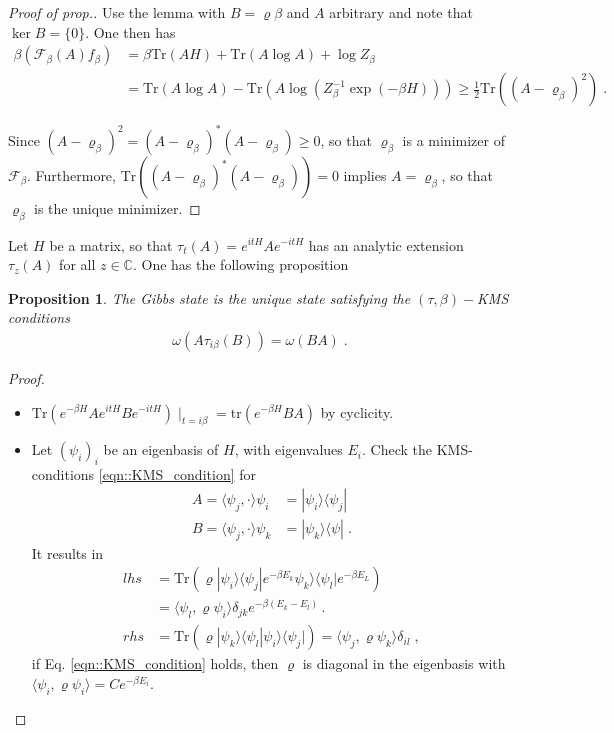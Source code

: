 \documentclass[
a4paper, %
11pt, %
onecolumn, %
openany, %
]{memoir}
\theoremstyle{definition}
\theoremstyle{remark}
\theoremstyle{plain}
\newtheorem{prop}[definition]{Proposition}
\begin{document}
\begin{proof}[Proof of prop.]
	Use the lemma with $B=\varrho\beta$ and $A$ arbitrary and note that $\ker B=\{0\}$. One then has \begin{align}
	\beta(\mathcal{F}_{\beta}(A)f_{\beta})&=\beta \mathrm{Tr}(AH)+\mathrm{Tr}(A\log A)+\log Z_{\beta}\\
	&=\mathrm{Tr}(A\log A)-\mathrm{Tr}(A\log (Z_{\beta}^{-1}\exp(-\beta H)))\geq \frac{1}{2} \mathrm{Tr}((A-\varrho_{\beta})^2)\; .
	\end{align}

Since $(A-\varrho_{\beta})^2=(A-\varrho_{\beta})^*(A-\varrho_{\beta})\geq 0$, so that $\varrho_{\beta}$ is a minimizer of $\mathcal{F}_{\beta}$. Furthermore, $\mathrm{Tr}((A-\varrho_{\beta})^*(A-\varrho_{\beta}))=0$ implies $A=\varrho_{\beta}$, so that $\varrho_{\beta}$ is the unique minimizer.\end{proof}
Let $H$ be a matrix, so that $\tau_t(A)=e^{itH}Ae^{-itH}$ has an analytic extension $\tau_z(A)$ for all $z\in\mathbb{C}$. One has the following proposition \begin{prop}
	The Gibbs state is the unique state satisfying the $(\tau,\beta)-$KMS conditions \begin{align}
	\omega(A\tau_{i\beta}(B))=\omega(BA) \label{eqn::KMS_condition}\; .
	\end{align}
\end{prop}
\begin{proof}
	\begin{itemize}
		\item $\mathrm{Tr}(e^{-\beta H}Ae^{itH}Be^{-itH})\mid_{t=i\beta}=\mathrm{tr}(e^{-\beta H}BA)$ by cyclicity.
		\item Let $(\psi_i)_i$ be an eigenbasis of $H$, with eigenvalues $E_i$. Check the KMS-conditions \eqref{eqn::KMS_condition} for\begin{align}
		A=\langle \psi_j,\cdot\rangle\psi_i&=|\psi_i\rangle\langle\psi_j|\\
		B=\langle\psi_j,\cdot\rangle\psi_k&=|\psi_k\rangle\langle\psi| \; .
		\end{align}
		It results in \begin{align}
		lhs &= \mathrm{Tr}(\varrho|\psi_i\rangle\langle\psi_j|e^{-\beta E_k}\psi_k\rangle\langle\psi_l|e^{-\beta E_L})\\
		&= \langle \psi_l,\varrho\psi_i\rangle \delta_{jk}e^{-\beta(E_k-E_l)}\,.\\
		rhs&= \mathrm{Tr}(\varrho|\psi_k\rangle\langle\psi_l|\psi_i\rangle\langle\psi_j|)=\langle\psi_j,\varrho\psi_k\rangle\delta_{il}\;,
		\end{align}
		if Eq. \eqref{eqn::KMS_condition} holds, then $\varrho$ is diagonal in the eigenbasis with $\langle \psi_i,\varrho\psi_i\rangle = Ce^{-\beta E_i}$.
	\end{itemize}
\end{proof}
\end{document}
